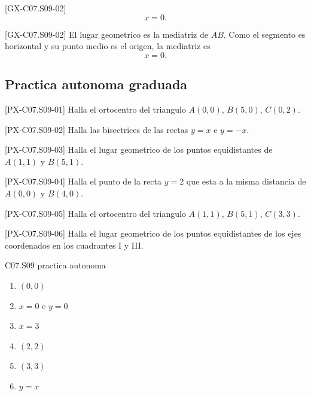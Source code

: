 \begin{shortanswer}{[GX-C07.S09-02]}
\[
x=0.
\]
\end{shortanswer}

\begin{fullsolution}{[GX-C07.S09-02]}
El lugar geometrico es la mediatriz de \(AB\). Como el segmento es horizontal y su punto medio
es el origen, la mediatriz es
\[
x=0.
\]
\end{fullsolution}

\subsection*{Practica autonoma graduada}
\begin{exercise}{[PX-C07.S09-01] Halla el ortocentro del triangulo \(A(0,0)\), \(B(5,0)\), \(C(0,2)\).}
\end{exercise}
\begin{exercise}{[PX-C07.S09-02] Halla las bisectrices de las rectas \(y=x\) e \(y=-x\).}
\end{exercise}
\begin{exercise}{[PX-C07.S09-03] Halla el lugar geometrico de los puntos equidistantes de \(A(1,1)\) y \(B(5,1)\).}
\end{exercise}
\begin{exercise}{[PX-C07.S09-04] Halla el punto de la recta \(y=2\) que esta a la misma distancia de \(A(0,0)\) y \(B(4,0)\).}
\end{exercise}
\begin{exercise}{[PX-C07.S09-05] Halla el ortocentro del triangulo \(A(1,1)\), \(B(5,1)\), \(C(3,3)\).}
\end{exercise}
\begin{exercise}{[PX-C07.S09-06] Halla el lugar geometrico de los puntos equidistantes de los ejes coordenados en los cuadrantes I y III.}
\end{exercise}

\begin{shortanswer}{C07.S09 practica autonoma}
\begin{enumerate}[label=\textbf{PX-C07.S09-\arabic*:}, leftmargin=*]
  \item \((0,0)\)
  \item \(x=0\) e \(y=0\)
  \item \(x=3\)
  \item \((2,2)\)
  \item \((3,3)\)
  \item \(y=x\)
\end{enumerate}
\end{shortanswer}

